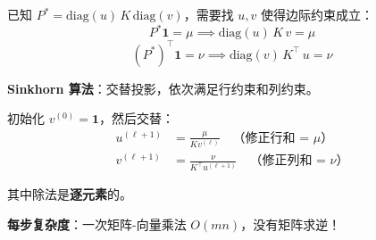 \documentclass[12pt, a4paper]{ctexart}
\begin{document}
\begin{blackboard}[Sinkhorn 迭代]

已知 $P^* = \text{diag}(u) \, K \, \text{diag}(v)$，需要找 $u, v$ 使得边际约束成立：
\[
P^* \mathbf{1} = \mu \implies \text{diag}(u) \, K \, v = \mu
\]
\[
(P^*)^\top \mathbf{1} = \nu \implies \text{diag}(v) \, K^\top \, u = \nu
\]

\textbf{Sinkhorn 算法}：交替投影，依次满足行约束和列约束。

初始化 $v^{(0)} = \mathbf{1}$，然后交替：
\begin{align*}
u^{(\ell+1)} &= \frac{\mu}{K v^{(\ell)}} \quad \text{（修正行和 = $\mu$）} \\[4pt]
v^{(\ell+1)} &= \frac{\nu}{K^\top u^{(\ell+1)}} \quad \text{（修正列和 = $\nu$）}
\end{align*}

其中除法是\textbf{逐元素}的。

\textbf{每步复杂度}：一次矩阵-向量乘法 $O(mn)$，没有矩阵求逆！

\end{blackboard}
\end{document}
